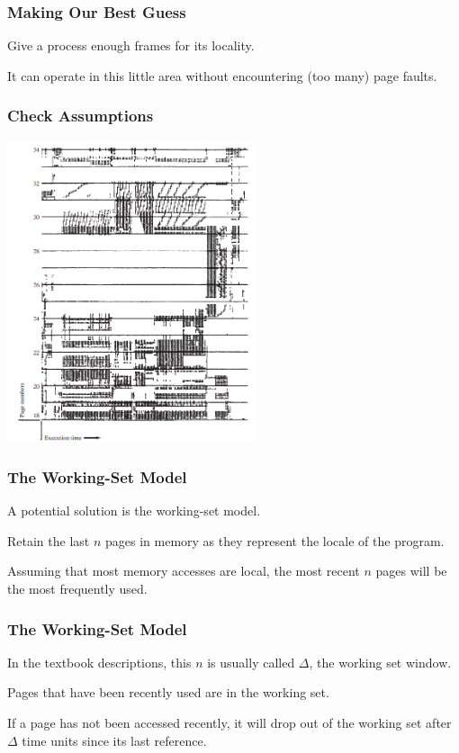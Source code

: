 \begin{frame}
\frametitle{Making Our Best Guess}

Give a process enough frames for its locality. 

It can operate in this little area without encountering (too many) page faults.


\end{frame}

\begin{frame}
\frametitle{Check Assumptions}

\begin{center}
\includegraphics[width=0.55\textwidth]{images/locality.png}
\end{center}


\end{frame}

\begin{frame}
\frametitle{The Working-Set Model}

A potential solution is the working-set model. 

Retain the last $n$ pages in memory as they represent the locale of the program. 

Assuming that most memory accesses are local, the most recent $n$ pages will be the most frequently used.


\end{frame}

\begin{frame}
\frametitle{The Working-Set Model}

In the textbook descriptions, this $n$ is usually called $\Delta$, the working set window. 

Pages that have been recently used are in the working set. 

If a page has not been accessed recently, it will drop out of the working set after $\Delta$ time units since its last reference. 

\end{frame}

